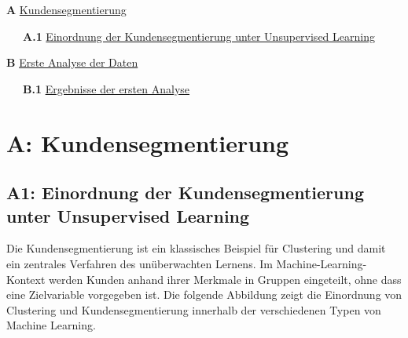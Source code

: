 \documentclass[
  11pt,
  openany, oneside]{book}
\begin{document}
\pagestyle{appendixTOC}

\noindent

\textbf{A} \hyperref[sec-anhangA]{Kundensegmentierung}
\dotfill  \pageref{sec-anhangA}

~~~\textbf{A.1} \hyperref[sec-anhangA1]{Einordnung der
Kundensegmentierung unter Unsupervised Learning}
\dotfill  \pageref{sec-anhangA1}

\textbf{B} \hyperref[sec-anhangB]{Erste Analyse der Daten}
\dotfill  \pageref{sec-anhangB}

~~~\textbf{B.1} \hyperref[sec-anhangB1]{Ergebnisse der ersten Analyse}
\dotfill  \pageref{sec-anhangB1}

\clearpage

\pagestyle{appendix}

\label{sec-anhangA}
\chapter*{A: Kundensegmentierung}\label{a-kundensegmentierung}


\label{sec-anhangA1}
\section*{A1: Einordnung der Kundensegmentierung unter Unsupervised
Learning}\label{a1-einordnung-der-kundensegmentierung-unter-unsupervised-learning}

Die Kundensegmentierung ist ein klassisches Beispiel für Clustering und
damit ein zentrales Verfahren des unüberwachten Lernens. Im
Machine-Learning-Kontext werden Kunden anhand ihrer Merkmale in Gruppen
eingeteilt, ohne dass eine Zielvariable vorgegeben ist. Die folgende
Abbildung zeigt die Einordnung von Clustering und Kundensegmentierung
innerhalb der verschiedenen Typen von Machine Learning.
\end{document}
